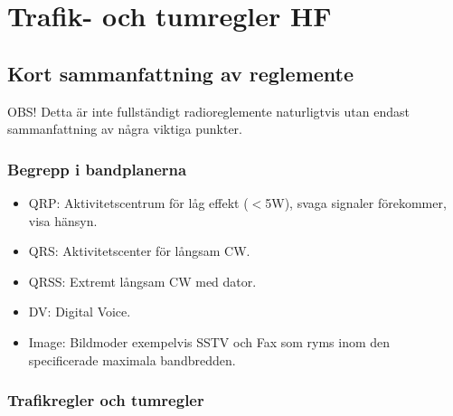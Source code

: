 \clearpage

\section{Trafik- och tumregler HF}
\subsection{Kort sammanfattning av reglemente}

OBS! Detta är inte fullständigt radioreglemente naturligtvis utan endast
sammanfattning av några viktiga punkter.

\subsubsection{Begrepp i bandplanerna}

\begin{itemize}
\item QRP: Aktivitetscentrum för låg effekt ($<$5W), svaga signaler
      förekommer, visa hänsyn.
\item QRS: Aktivitetscenter för långsam CW.
\item QRSS: Extremt långsam CW med dator.
\item DV: Digital Voice.
\item Image: Bildmoder exempelvis SSTV och Fax som ryms inom den specificerade
	  maximala bandbredden.
\end{itemize}

\subsubsection{Trafikregler och tumregler}

